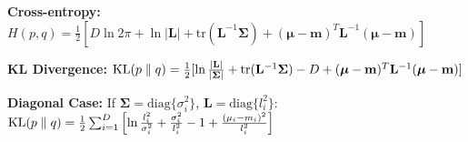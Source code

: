 \textbf{Cross-entropy:} $H(p,q) = \frac{1}{2}[D \ln 2\pi + \ln|\mathbf{L}| + \text{tr}(\mathbf{L}^{-1}\boldsymbol{\Sigma}) + (\boldsymbol{\mu} - \mathbf{m})^T \mathbf{L}^{-1}(\boldsymbol{\mu} - \mathbf{m})]$

\textbf{KL Divergence:} $\operatorname{KL}(p \parallel q) = \frac{1}{2}[\ln \frac{|\mathbf{L}|}{|\boldsymbol{\Sigma}|} + \text{tr}(\mathbf{L}^{-1}\boldsymbol{\Sigma}) - D + (\boldsymbol{\mu} - \mathbf{m})^T \mathbf{L}^{-1}(\boldsymbol{\mu} - \mathbf{m})]$

\textbf{Diagonal Case:} If $\boldsymbol{\Sigma} = \text{diag}\{\sigma_i^2\}$, $\mathbf{L} = \text{diag}\{l_i^2\}$:
$\operatorname{KL}(p \parallel q) = \frac{1}{2}\sum_{i=1}^D \left[\ln \frac{l_i^2}{\sigma_i^2} + \frac{\sigma_i^2}{l_i^2} - 1 + \frac{(\mu_i - m_i)^2}{l_i^2}\right]$